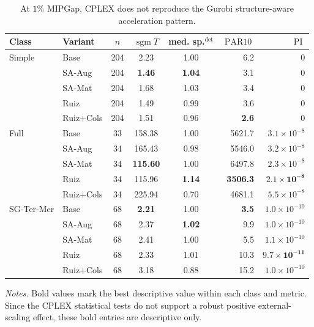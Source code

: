 \documentclass[AMA,Times1COL]{WileyNJDv5} %
\newcommand{\methodBase}{Base}
\newcommand{\methodAug}{SA-Aug}
\newcommand{\methodMat}{SA-Mat}
\newcommand{\methodRuiz}{Ruiz}
\newcommand{\methodRuizCols}{Ruiz+Cols}
\newcommand{\sgm}{\ensuremath{\operatorname{sgm}}}
\newcommand{\PARten}{\ensuremath{\operatorname{PAR10}}}
\newcommand{\PI}{\ensuremath{\operatorname{PI}}}
\providecommand{\DIFaddbegin}{} %
\providecommand{\DIFaddend}{} %
\providecommand{\DIFdelend}{} %
\begin{document}
\DIFdelend \DIFaddbegin \begin{table}[t]
\centering
\footnotesize
\caption{At $1\%$ MIPGap, CPLEX does not reproduce the Gurobi structure-aware acceleration pattern.}
\label{tab:robust-cplex-1pct-mipgap}
\begin{tabular}{@{}ll S[table-format=3.0] S[table-format=3.2] S[table-format=1.2] r r @{}}
\toprule
Class & Variant & {$n$} & {$\sgm T$} & {med. sp.$^{\det}$} & {\PARten{}} & {\PI{}} \\
\midrule
Simple & \methodBase & 204 & 2.23 & 1.00 & 6.2 & 0 \\
 & \methodAug & 204 & \textbf{1.46} & \textbf{1.04} & 3.1 & 0 \\
 & \methodMat & 204 & 1.68 & 1.03 & 3.4 & 0 \\
 & \methodRuiz & 204 & 1.49 & 0.99 & 3.6 & 0 \\
 & \methodRuizCols & 204 & 1.51 & 0.96 & \textbf{2.6} & 0 \\
\addlinespace
Full & \methodBase & 33 & 158.38 & 1.00 & 5621.7 & $3.1\times10^{-8}$ \\
 & \methodAug & 34 & 165.43 & 0.98 & 5546.0 & $3.2\times10^{-8}$ \\
 & \methodMat & 34 & \textbf{115.60} & 1.00 & 6497.8 & $2.3\times10^{-8}$ \\
 & \methodRuiz & 34 & 115.96 & \textbf{1.14} & \textbf{3506.3} & $\mathbf{2.1\times10^{-8}}$ \\
 & \methodRuizCols & 34 & 225.94 & 0.70 & 4681.1 & $5.5\times10^{-8}$ \\
\addlinespace
SG-Ter-Mer & \methodBase & 68 & \textbf{2.21} & 1.00 & \textbf{3.5} & $1.0\times10^{-10}$ \\
 & \methodAug & 68 & 2.37 & \textbf{1.02} & 9.9 & $1.0\times10^{-10}$ \\
 & \methodMat & 68 & 2.41 & 1.00 & 5.5 & $1.1\times10^{-10}$ \\
 & \methodRuiz & 68 & 2.33 & 1.01 & 10.3 & $\mathbf{9.7\times10^{-11}}$ \\
 & \methodRuizCols & 68 & 3.18 & 0.88 & 15.2 & $1.0\times10^{-10}$ \\
\bottomrule
\end{tabular}
\begin{flushleft}\footnotesize
\emph{Notes.} Bold values mark the best descriptive value within each class and metric.
Since the CPLEX statistical tests do not support a robust positive external-scaling effect,
these bold entries are descriptive only.
\end{flushleft}
\end{table}
\DIFaddend 
\end{document}
